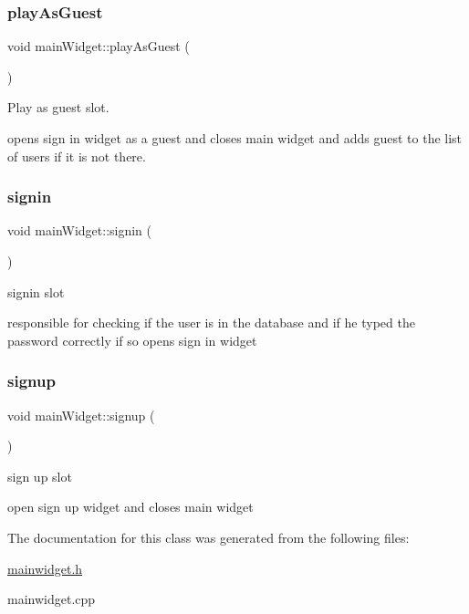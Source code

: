 \subsubsection{\texorpdfstring{play\+As\+Guest}{playAsGuest}}
{\footnotesize\ttfamily void main\+Widget\+::play\+As\+Guest (\begin{DoxyParamCaption}{ }\end{DoxyParamCaption})\hspace{0.3cm}{\ttfamily [slot]}}



Play as guest slot. 

opens sign in widget as a guest and closes main widget and adds guest to the list of users if it is not there. \mbox{\label{classmainWidget_a18a889384066a82c65b71cd9d26a4dcb}} 
\subsubsection{\texorpdfstring{signin}{signin}}
{\footnotesize\ttfamily void main\+Widget\+::signin (\begin{DoxyParamCaption}{ }\end{DoxyParamCaption})\hspace{0.3cm}{\ttfamily [slot]}}



signin slot 

responsible for checking if the user is in the database and if he typed the password correctly if so opens sign in widget \mbox{\label{classmainWidget_a90ca9a99780c436835324252d7b97fb8}} 
\subsubsection{\texorpdfstring{signup}{signup}}
{\footnotesize\ttfamily void main\+Widget\+::signup (\begin{DoxyParamCaption}{ }\end{DoxyParamCaption})\hspace{0.3cm}{\ttfamily [slot]}}



sign up slot 

open sign up widget and closes main widget 

The documentation for this class was generated from the following files\+:\begin{DoxyCompactItemize}
\item 
\hyperlink{mainwidget_8h}{mainwidget.\+h}\item 
mainwidget.\+cpp\end{DoxyCompactItemize}
